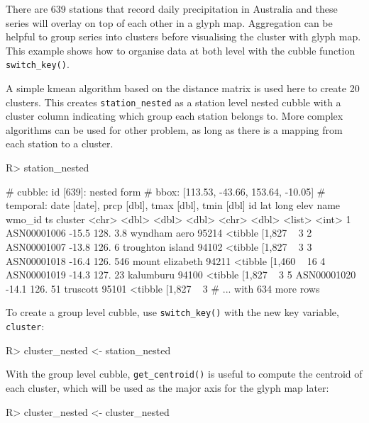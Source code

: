 \documentclass[
]{jss}
\begin{document}
There are 639 stations that record daily precipitation in Australia and
these series will overlay on top of each other in a glyph map.
Aggregation can be helpful to group series into clusters before
visualising the cluster with glyph map. This example shows how to
organise data at both level with the cubble function
\texttt{switch\_key()}.

A simple kmean algorithm based on the distance matrix is used here to
create 20 clusters. This creates \texttt{station\_nested} as a station
level nested cubble with a cluster column indicating which group each
station belongs to. More complex algorithms can be used for other
problem, as long as there is a mapping from each station to a cluster.

\begin{CodeChunk}
\begin{CodeInput}
R> station_nested
\end{CodeInput}
\begin{CodeOutput}
# cubble:   id [639]: nested form
# bbox:     [113.53, -43.66, 153.64, -10.05]
# temporal: date [date], prcp [dbl], tmax [dbl], tmin [dbl]
  id            lat  long  elev name             wmo_id ts               cluster
  <chr>       <dbl> <dbl> <dbl> <chr>             <dbl> <list>             <int>
1 ASN00001006 -15.5  128.   3.8 wyndham aero      95214 <tibble [1,827 ~       3
2 ASN00001007 -13.8  126.   6   troughton island  94102 <tibble [1,827 ~       3
3 ASN00001018 -16.4  126. 546   mount elizabeth   94211 <tibble [1,460 ~      16
4 ASN00001019 -14.3  127.  23   kalumburu         94100 <tibble [1,827 ~       3
5 ASN00001020 -14.1  126.  51   truscott          95101 <tibble [1,827 ~       3
# ... with 634 more rows
\end{CodeOutput}
\end{CodeChunk}

To create a group level cubble, use \texttt{switch\_key()} with the new
key variable, \texttt{cluster}:

\begin{CodeChunk}
\begin{CodeInput}
R> cluster_nested <- station_nested %
\end{CodeInput}
\end{CodeChunk}

With the group level cubble, \texttt{get\_centroid()} is useful to
compute the centroid of each cluster, which will be used as the major
axis for the glyph map later:

\begin{CodeChunk}
\begin{CodeInput}
R> cluster_nested <- cluster_nested %
\end{CodeInput}
\end{CodeChunk}
\end{document}
